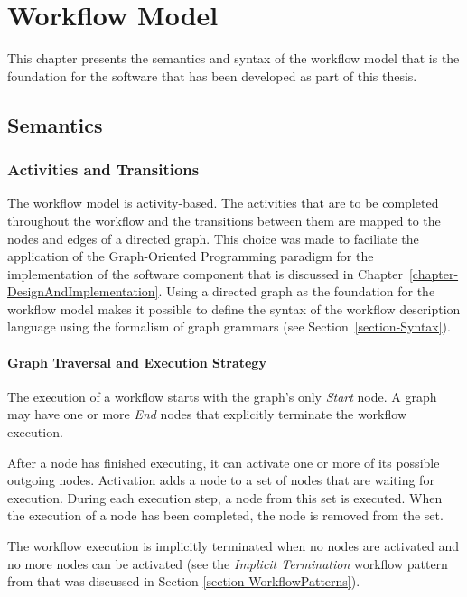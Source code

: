 \chapter{Workflow Model}
\label{chapter-WorkflowModel}

This chapter presents the semantics and syntax of the workflow model that is
the foundation for the software that has been developed as part of this thesis.

\section{Semantics}

\subsection{Activities and Transitions}

The workflow model is activity-based. The activities that are to be completed
throughout the workflow and the transitions between them are mapped to the
nodes and edges of a directed graph. This choice was made to faciliate the
application of the Graph-Oriented Programming paradigm for the implementation
of the software component that is discussed in
Chapter~\ref{chapter-DesignAndImplementation}. Using a directed graph as the
foundation for the workflow model makes it possible to define the syntax of
the workflow description language using the formalism of graph grammars (see
Section~\ref{section-Syntax}).

\subsubsection{Graph Traversal and Execution Strategy}

The execution of a workflow starts with the graph's only \emph{Start} node. A
graph may have one or more \emph{End} nodes that explicitly terminate the
workflow execution.

After a node has finished executing, it can activate one or more of its
possible outgoing nodes. Activation adds a node to a set of nodes that
are waiting for execution. During each execution step, a node from this set
is executed. When the execution of a node has been completed, the node is
removed from the set.

The workflow execution is implicitly terminated when no nodes are activated
and no more nodes can be activated (see the \emph{Implicit Termination}
workflow pattern from \cite{BK03} that was discussed in Section
\ref{section-WorkflowPatterns}).

